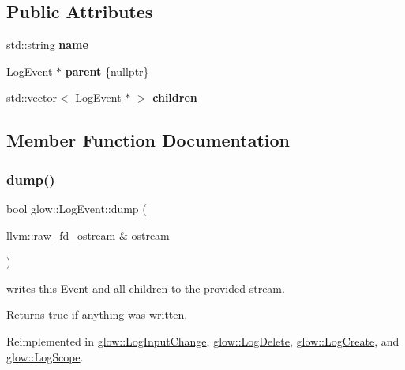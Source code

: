 \subsection*{Public Attributes}
\begin{DoxyCompactItemize}
\item 
\mbox{\label{structglow_1_1_log_event_ab58c962baf138678fa8e29cd42f54549}} 
std\+::string {\bfseries name}
\item 
\mbox{\label{structglow_1_1_log_event_a3483b7391cf7f1949ad27b6935f464b7}} 
\hyperlink{structglow_1_1_log_event}{Log\+Event} $\ast$ {\bfseries parent} \{nullptr\}
\item 
\mbox{\label{structglow_1_1_log_event_a37c5e5e23e3d2b1dbf4cef5ae64f9e74}} 
std\+::vector$<$ \hyperlink{structglow_1_1_log_event}{Log\+Event} $\ast$ $>$ {\bfseries children}
\end{DoxyCompactItemize}


\subsection{Member Function Documentation}
\mbox{\label{structglow_1_1_log_event_a1c25aa690ea65f6b184ba3133fd6c564}} 
\subsubsection{\texorpdfstring{dump()}{dump()}}
{\footnotesize\ttfamily bool glow\+::\+Log\+Event\+::dump (\begin{DoxyParamCaption}\item[{llvm\+::raw\+\_\+fd\+\_\+ostream \&}]{ostream }\end{DoxyParamCaption})\hspace{0.3cm}{\ttfamily [virtual]}}

writes this Event and all children to the provided stream. \begin{DoxyReturn}{Returns}
true if anything was written. 
\end{DoxyReturn}


Reimplemented in \hyperlink{structglow_1_1_log_input_change_abe24dc999f25edf277ec308940827431}{glow\+::\+Log\+Input\+Change}, \hyperlink{structglow_1_1_log_delete_a8d29cdcc6351be77ac45d28fef52a3f9}{glow\+::\+Log\+Delete}, \hyperlink{structglow_1_1_log_create_a42bb56ee4419b7a56af5a8e3f55c1a1f}{glow\+::\+Log\+Create}, and \hyperlink{structglow_1_1_log_scope_acab7040ff048222a7128d9d7c43bb92a}{glow\+::\+Log\+Scope}.

